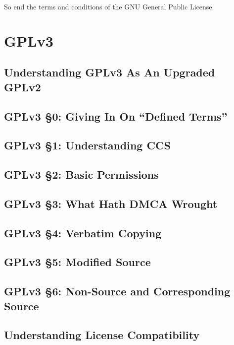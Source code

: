 So end the terms and conditions of the GNU General Public License.

\chapter{GPLv3}
\label{GPLv3}

\section{Understanding GPLv3 As An Upgraded GPLv2}

\section{GPLv3 \S 0: Giving In On ``Defined Terms''}

\section{GPLv3 \S 1: Understanding CCS}

\section{GPLv3 \S 2: Basic Permissions}

\section{GPLv3 \S 3: What Hath DMCA Wrought}
\label{GPLv3s3}
\section{GPLv3 \S 4: Verbatim Copying}

\section{GPLv3 \S 5: Modified Source}

\section{GPLv3 \S 6: Non-Source and Corresponding Source}

\section{Understanding License Compatibility}
\label{license-compatibility}

